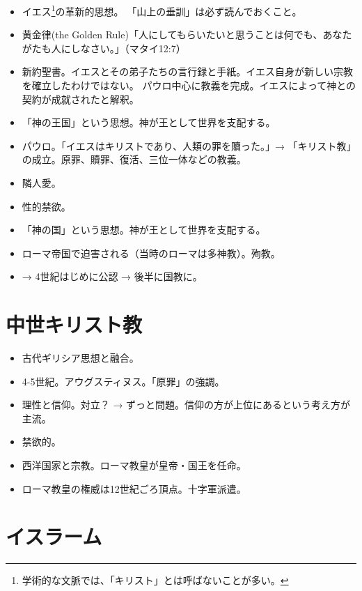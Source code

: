\documentclass[uplatex,dvipdfmx]{jsarticle} \usepackage{mystyle}%
\begin{document}
\begin{itemize}

\item イエス\footnote{学術的な文脈では、「キリスト」とは呼ばないことが多い。}の革新的思想。
「山上の垂訓」は必ず読んでおくこと。
\item 黄金律(the Golden Rule)「人にしてもらいたいと思うことは何でも、あなたがたも人にしなさい。」（マタイ12:7）
\item 新約聖書。イエスとその弟子たちの言行録と手紙。イエス自身が新しい宗教を確立したわけではない。
パウロ中心に教義を完成。イエスによって神との契約が成就されたと解釈。
\item 「神の王国」という思想。神が王として世界を支配する。
\item パウロ。「イエスはキリストであり、人類の罪を贖った。」→ 「キリスト教」の成立。原罪、贖罪、復活、三位一体などの教義。
\item 隣人愛。
\item 性的禁欲。
\item 「神の国」という思想。神が王として世界を支配する。
\item ローマ帝国で迫害される（当時のローマは多神教）。殉教。
\item → 4世紀はじめに公認 → 後半に国教に。

\end{itemize}


\section{中世キリスト教}

\begin{itemize}
\item 古代ギリシア思想と融合。
\item 4-5世紀。アウグスティヌス。「原罪」の強調。
\item 理性と信仰。対立？  → ずっと問題。信仰の方が上位にあるという考え方が主流。
\item 禁欲的。
\item 西洋国家と宗教。ローマ教皇が皇帝・国王を任命。
\item ローマ教皇の権威は12世紀ごろ頂点。十字軍派遣。
\end{itemize}





\section{イスラーム}
\end{document}
